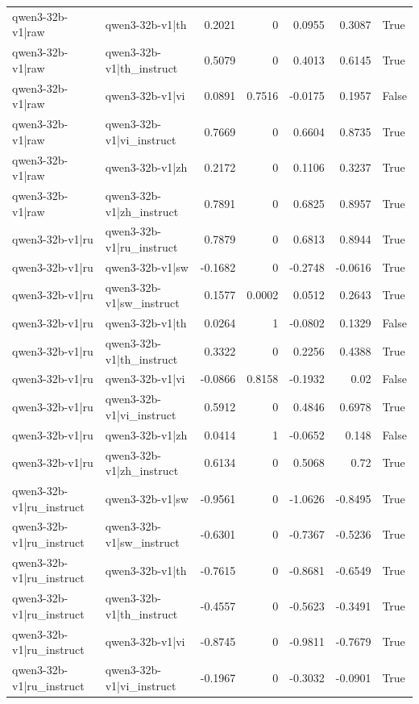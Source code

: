 \begin{table}
\begin{tabular}{l l r r r r l}
qwen3-32b-v1|raw & qwen3-32b-v1|th & 0.2021 & 0 & 0.0955 & 0.3087 & True \\
qwen3-32b-v1|raw & qwen3-32b-v1|th_instruct & 0.5079 & 0 & 0.4013 & 0.6145 & True \\
qwen3-32b-v1|raw & qwen3-32b-v1|vi & 0.0891 & 0.7516 & -0.0175 & 0.1957 & False \\
qwen3-32b-v1|raw & qwen3-32b-v1|vi_instruct & 0.7669 & 0 & 0.6604 & 0.8735 & True \\
qwen3-32b-v1|raw & qwen3-32b-v1|zh & 0.2172 & 0 & 0.1106 & 0.3237 & True \\
qwen3-32b-v1|raw & qwen3-32b-v1|zh_instruct & 0.7891 & 0 & 0.6825 & 0.8957 & True \\
qwen3-32b-v1|ru & qwen3-32b-v1|ru_instruct & 0.7879 & 0 & 0.6813 & 0.8944 & True \\
qwen3-32b-v1|ru & qwen3-32b-v1|sw & -0.1682 & 0 & -0.2748 & -0.0616 & True \\
qwen3-32b-v1|ru & qwen3-32b-v1|sw_instruct & 0.1577 & 0.0002 & 0.0512 & 0.2643 & True \\
qwen3-32b-v1|ru & qwen3-32b-v1|th & 0.0264 & 1 & -0.0802 & 0.1329 & False \\
qwen3-32b-v1|ru & qwen3-32b-v1|th_instruct & 0.3322 & 0 & 0.2256 & 0.4388 & True \\
qwen3-32b-v1|ru & qwen3-32b-v1|vi & -0.0866 & 0.8158 & -0.1932 & 0.02 & False \\
qwen3-32b-v1|ru & qwen3-32b-v1|vi_instruct & 0.5912 & 0 & 0.4846 & 0.6978 & True \\
qwen3-32b-v1|ru & qwen3-32b-v1|zh & 0.0414 & 1 & -0.0652 & 0.148 & False \\
qwen3-32b-v1|ru & qwen3-32b-v1|zh_instruct & 0.6134 & 0 & 0.5068 & 0.72 & True \\
qwen3-32b-v1|ru_instruct & qwen3-32b-v1|sw & -0.9561 & 0 & -1.0626 & -0.8495 & True \\
qwen3-32b-v1|ru_instruct & qwen3-32b-v1|sw_instruct & -0.6301 & 0 & -0.7367 & -0.5236 & True \\
qwen3-32b-v1|ru_instruct & qwen3-32b-v1|th & -0.7615 & 0 & -0.8681 & -0.6549 & True \\
qwen3-32b-v1|ru_instruct & qwen3-32b-v1|th_instruct & -0.4557 & 0 & -0.5623 & -0.3491 & True \\
qwen3-32b-v1|ru_instruct & qwen3-32b-v1|vi & -0.8745 & 0 & -0.9811 & -0.7679 & True \\
qwen3-32b-v1|ru_instruct & qwen3-32b-v1|vi_instruct & -0.1967 & 0 & -0.3032 & -0.0901 & True \\

\end{tabular}
\end{table}

